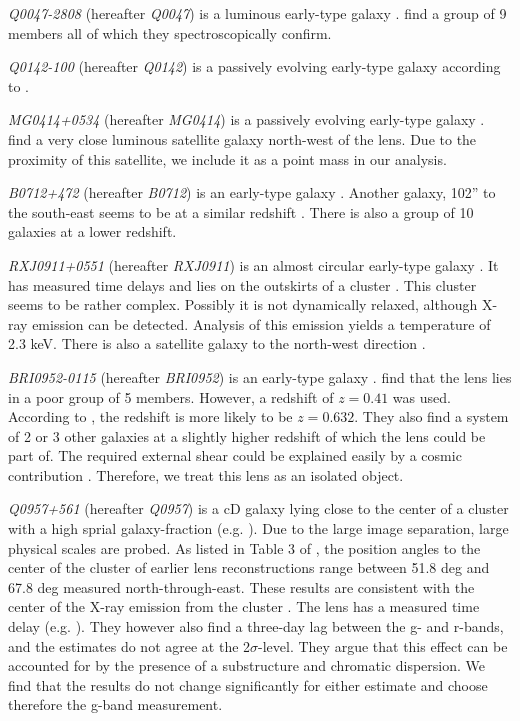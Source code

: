 \documentclass[useAMS,usenatbib]{mn2e}
\begin{document}
\textit{Q0047-2808} (hereafter \textit{Q0047}) is a luminous early-type galaxy \citep{1996MNRAS.278..139W}. \cite{2011ApJ...726...84W} find a group of 9 members all of which they spectroscopically confirm.

\textit{Q0142-100} (hereafter \textit{Q0142}) is a passively evolving early-type galaxy according to \citep{2000ApJ...536..584L,2007A&A...465...51E}.

\textit{MG0414+0534} (hereafter \textit{MG0414}) is a passively evolving early-type galaxy \citep{1999AJ....117.2034T}. \cite{1993AJ....105....1S} find a very close luminous satellite galaxy north-west of the lens. Due to the proximity of this satellite, we include it as a point mass in our analysis.

\textit{B0712+472} (hereafter \textit{B0712}) is an early-type galaxy \citep{1998AJ....115..377F}. Another galaxy, 102'' to the south-east seems to be at a similar redshift \citep{2002AJ....123..627F}. There is also a group of 10 galaxies at a lower redshift.

\textit{RXJ0911+0551} (hereafter \textit{RXJ0911}) is an almost circular early-type galaxy \citep{2012A&A...538A..99S}. It has measured time delays \citep{2002ApJ...572L..11H} and lies on the outskirts of a cluster \citep{2001ApJ...555....1M}. This cluster seems to be rather complex. Possibly it is not dynamically relaxed, although X-ray emission can be detected. Analysis of this emission yields a temperature of 2.3 keV. There is also a satellite galaxy to the north-west direction \citep{2000ApJ...544L..35K}.

\textit{BRI0952-0115} (hereafter \textit{BRI0952}) is an early-type galaxy \citep{2000ApJ...536..584L,2007A&A...465...51E}. \cite{2006ApJ...641..169M} find that the lens lies in a poor group of 5 members. However, a redshift of $z=0.41$ was used. According to \cite{2007A&A...465...51E}, the redshift is more likely to be $z=0.632$. They also find a system of 2 or 3 other galaxies at a slightly higher redshift of which the lens could be part of. The required external shear could be explained easily by a cosmic contribution \citep{2000ApJ...536..584L}. Therefore, we treat this lens as an isolated object.

\textit{Q0957+561} (hereafter \textit{Q0957}) is a cD galaxy lying close to the center of a cluster with a high sprial galaxy-fraction (e.g. \cite{1992MNRAS.254P..27G,1994A&A...291..411A,1998ApJ...504..661C}). Due to the large image separation, large physical scales are probed. As listed in Table 3 of \cite{2000ApJ...542...74K}, the position angles to the center of the cluster of earlier lens reconstructions range between 51.8 deg and 67.8 deg measured north-through-east. These results are consistent with the center of the X-ray emission from the cluster \citep{1998ApJ...504..661C}. The lens has a measured time delay (e.g. \cite{2012A&A...540A.132S}). They however also find a three-day lag between the g- and r-bands, and the estimates do not agree at the 2$\sigma$-level. They argue that this effect can be accounted for by the presence of a substructure and chromatic dispersion. We find that the results do not change significantly for either estimate and choose therefore the g-band measurement.
\end{document}
